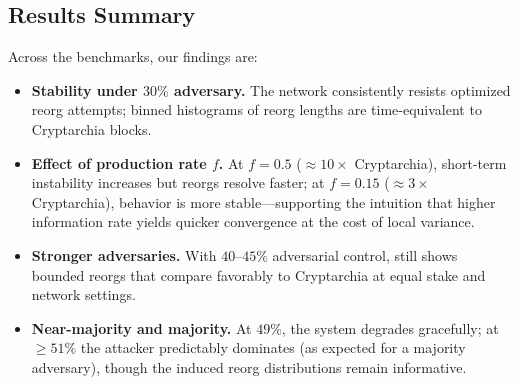 \subsection{Results Summary}
Across the benchmarks, our findings are:
\begin{itemize}
  \item \textbf{Stability under $30\%$ adversary.} The network consistently resists optimized reorg attempts; binned histograms of reorg lengths are time-equivalent to Cryptarchia blocks.
  
  \item \textbf{Effect of production rate $f$.} At $f{=}0.5$ (${\approx}10\times$ Cryptarchia), short-term instability increases but reorgs resolve faster; at $f{=}0.15$ (${\approx}3\times$ Cryptarchia), behavior is more stable---supporting the intuition that higher information rate yields quicker convergence at the cost of local variance.
  \item \textbf{Stronger adversaries.} With $40$--$45\%$ adversarial control, \ProjBase still shows bounded reorgs that compare favorably to Cryptarchia at equal stake and network settings.
  \item \textbf{Near-majority and majority.} At $49\%$, the system degrades gracefully; at ${\ge}51\%$ the attacker predictably dominates (as expected for a majority adversary), though the induced reorg distributions remain informative.
\end{itemize}

\iffalse
\subsection{Empirical Evidence for Tip Boundedness}
To support the analytic TB lemmas, we instrument the simulator to sample $|\Tips(G_t)|$ each slot $t$ and compute distributional statistics over long runs (e.g., $10^6$ slots). We report:
\begin{itemize}
  \item the time series of concurrent tip count and its moving average;
  \item the empirical cumulative distribution function (CDF) of $|\Tips(G_t)|$; 
  \item the $95$th/ $99$th percentile of $|\Tips(G_t)|$ as a function of $(\Delta, w, f)$;
  \item cross-plots of concurrent tips versus reorg length to show correlation.
\end{itemize}
In all configurations where $w\ge \Delta$ and honest stake $> 1/2$, the empirical $95$th percentile of concurrent tips remains bounded by a small constant times $\Delta \cdot$ (honest block rate), consistent with the predicted $\beta=O(\Delta \cdot \text{block rate})$. When $w<\Delta$, the bound degrades and outliers appear, indicating that window size must cover propagation delay to sustain TB with high probability. These measurements reinforce that TB is not only theoretically necessary but also \emph{observably} maintained under the recommended parameter regimes.
\fi

